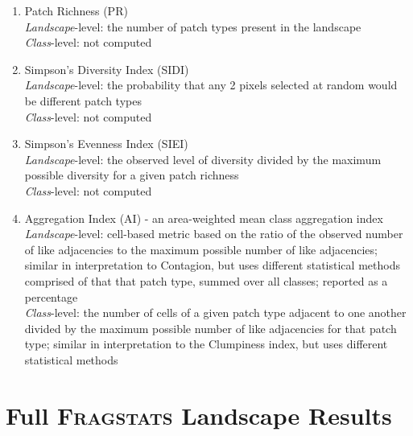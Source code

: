 \begin{enumerate}
	\item Patch Richness (PR)\\
	\emph{Landscape}-level: the number of patch types present in the landscape	\\
	\emph{Class}-level: not computed \\
	
	\item Simpson's Diversity Index (SIDI)\\
	\emph{Landscape}-level: the probability that any 2 pixels selected at random would be different patch types	\\
	\emph{Class}-level: not computed\\
	
	\item Simpson's Evenness Index (SIEI) \\
	\emph{Landscape}-level:  the observed level of diversity divided by the maximum possible diversity for a given patch richness 	\\
	\emph{Class}-level: not computed\\
	
	\item Aggregation Index (AI) - an area-weighted mean class aggregation index \\
	\emph{Landscape}-level: cell-based metric based on the ratio of the observed number of like adjacencies to the maximum possible number of like 
adjacencies; similar in interpretation to Contagion, but uses different statistical methods
comprised of that that patch type, summed over all classes; reported as a percentage	\\
	\emph{Class}-level: the number of cells of a given patch type adjacent to one another divided by the maximum possible number of like 
adjacencies for that patch type; similar in interpretation to the Clumpiness index, but uses different statistical methods	\\
\end{enumerate}

\chapter{Full \textsc{Fragstats} Landscape Results}
\label{sec:full-land-results}

